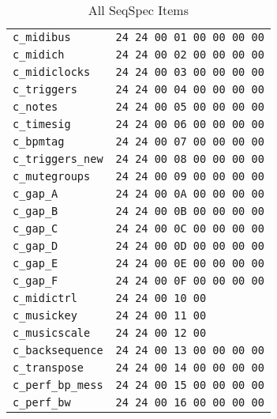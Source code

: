    \begin{table}[htb]
      \centering
      \caption{All SeqSpec Items}
      \label{table:seqspec_items_all}
      \begin{tabular}{l l}
         \texttt{c\_midibus}        & \texttt{24 24 00 01 00 00 00 00} \\
         \texttt{c\_midich}         & \texttt{24 24 00 02 00 00 00 00} \\
         \texttt{c\_midiclocks}     & \texttt{24 24 00 03 00 00 00 00} \\
         \texttt{c\_triggers}       & \texttt{24 24 00 04 00 00 00 00} \\
         \texttt{c\_notes}          & \texttt{24 24 00 05 00 00 00 00} \\
         \texttt{c\_timesig}        & \texttt{24 24 00 06 00 00 00 00} \\
         \texttt{c\_bpmtag}         & \texttt{24 24 00 07 00 00 00 00} \\
         \texttt{c\_triggers\_new}  & \texttt{24 24 00 08 00 00 00 00} \\
         \texttt{c\_mutegroups}     & \texttt{24 24 00 09 00 00 00 00} \\
         \texttt{c\_gap\_A}         & \texttt{24 24 00 0A 00 00 00 00} \\
         \texttt{c\_gap\_B}         & \texttt{24 24 00 0B 00 00 00 00} \\
         \texttt{c\_gap\_C}         & \texttt{24 24 00 0C 00 00 00 00} \\
         \texttt{c\_gap\_D}         & \texttt{24 24 00 0D 00 00 00 00} \\
         \texttt{c\_gap\_E}         & \texttt{24 24 00 0E 00 00 00 00} \\
         \texttt{c\_gap\_F}         & \texttt{24 24 00 0F 00 00 00 00} \\
         \texttt{c\_midictrl}       & \texttt{24 24 00 10 00} \\
         \texttt{c\_musickey}       & \texttt{24 24 00 11 00} \\
         \texttt{c\_musicscale}     & \texttt{24 24 00 12 00} \\
         \texttt{c\_backsequence}   & \texttt{24 24 00 13 00 00 00 00} \\
         \texttt{c\_transpose}      & \texttt{24 24 00 14 00 00 00 00} \\
         \texttt{c\_perf\_bp\_mess} & \texttt{24 24 00 15 00 00 00 00} \\
         \texttt{c\_perf\_bw}       & \texttt{24 24 00 16 00 00 00 00} \\

\end{tabular}
\end{table}

